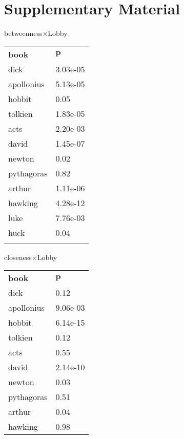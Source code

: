 \pagebreak\section*{Supplementary Material}
\begin{table}[ht]
	\begin{center} 
{\begin{minipage}{0.3\textwidth}
\hspace{.7cm}\hbox{betweenness$\times$Lobby} \par \smallskip
	\begin{tabular}{@{}p{1.6cm}p{1.3cm}@{}} \toprule 
		\bf book & $\mathbf p$ \\ \colrule 
		dick & 3.03e-05 \\ 
		apollonius & 5.13e-05 \\ 
		hobbit & 0.05 \\ 
		tolkien & 1.83e-05 \\ 
		acts & 2.20e-03 \\ 
		david & 1.45e-07 \\ 
		newton & 0.02 \\ 
		pythagoras & 0.82 \\ 
		arthur & 1.11e-06 \\ 
		hawking & 4.28e-12 \\ 
		luke & 7.76e-03 \\ 
		huck & 0.04 \\ 
	\botrule\end{tabular}\end{minipage}
\begin{minipage}{0.3\textwidth}
\hspace{.7cm}\hbox{closeness$\times$Lobby} \par \smallskip
	\begin{tabular}{@{}p{1.6cm}p{1.3cm}@{}} \toprule 
		\bf book & $\mathbf p$ \\ \colrule 
		dick & 0.12 \\ 
		apollonius & 9.06e-03 \\ 
		hobbit & 6.14e-15 \\ 
		tolkien & 0.12 \\ 
		acts & 0.55 \\ 
		david & 2.14e-10 \\ 
		newton & 0.03 \\ 
		pythagoras & 0.51 \\ 
		arthur & 0.04 \\ 
		hawking & 0.98 \\ 

\end{tabular}
\end{minipage}}
\end{center}
\end{table}
